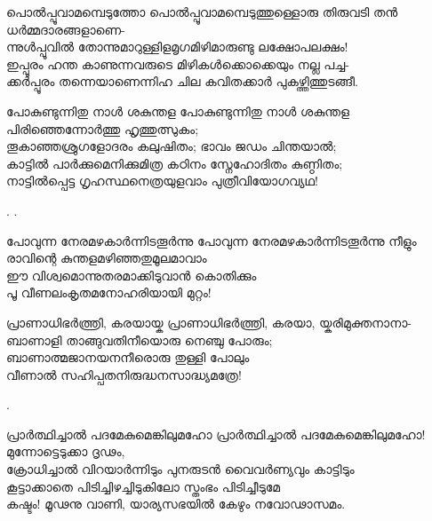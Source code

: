 \begin{enumerate}


\begin{slokam}{\VSr}{\VNM}{പൊൽപ്പൂവാമമ്പെടുത്തോ}
പൊൽപ്പൂവാമമ്പെടുത്തുള്ളൊരു തിരുവടി തൻ ധർമ്മദാരങ്ങളാണെ-\\
ന്നുൾപ്പൂവിൽ തോന്നുമാറുള്ളിളമൃഗമിഴിമാരുണ്ടു ലക്ഷോപലക്ഷം! \\
ഇപ്പൂരം ഹന്ത കാണുന്നവരുടെ മിഴികൾക്കൊക്കെയും നല്ല പച്ച-\\
ക്കർപ്പൂരം തന്നെയാണെന്നിഹ ചില കവിതക്കാർ പുകഴ്ത്തിത്തുടങ്ങീ.
\end{slokam}


\begin{slokam}{\VSv}{\ARRV}{പോകുണ്ടുന്നിതു നാൾ ശകുന്തള}
പോകുണ്ടുന്നിതു നാൾ ശകുന്തള പിരിഞ്ഞെന്നോർത്തു ഹൃത്തുത്സുകം;\\
തൂകാഞ്ഞശ്രുഗളോദരം കലുഷിതം; ഭാവം ജഡം ചിന്തയാൽ;\\
കാട്ടിൽ പാർക്കുമെനിക്കുമിത്ര കഠിനം സ്നേഹോദിതം കുണ്ഠിതം;\\
നാട്ടിൽപ്പെട്ട ഗൃഹസ്ഥനെത്രയുളവാം പുത്രീവിയോഗവ്യഥ!
\end{slokam}


.
.

\begin{slokam}{\VVt}{\HM}{പോവുന്ന നേരമഴകാർന്നിടതൂർന്നു}
പോവുന്ന നേരമഴകാർന്നിടതൂർന്നു നീളും\\
രാവിന്റെ കുന്തളമഴിഞ്ഞതുമൂലമാവാം\\
ഈ വിശ്വമൊന്നുതരമാക്കിടുവാൻ കൊതിക്കും\\
പൂ വീണലംകൃതമനോഹരിയായി മുറ്റം!
\end{slokam}





\begin{slokam}{\VVt}{\VNM}{പ്രാണാധിഭർത്ത്രി, കരയായ്ക}
 പ്രാണാധിഭർത്ത്രി, കരയാ, യ്കരിമുക്തനാനാ-\\
ബാണാളി താങ്ങുവതിനീയൊരു നെഞ്ചു പോരും;\\
ബാണാത്മജാനയനനീരൊരു തുള്ളി പോലും\\
വീണാൽ സഹിപ്പതനിരുദ്ധനസാദ്ധ്യമത്രേ!
\end{slokam}


.



\begin{slokam}{\VSv}{\ARRV}{പ്രാര്‍ത്ഥിച്ചാല്‍ പദമേകുമെങ്കിലുമഹോ}
 പ്രാര്‍ത്ഥിച്ചാല്‍ പദമേകുമെങ്കിലുമഹോ! മുന്നോട്ടെടുക്കാ ദൃഢം,\\
ക്രോധിച്ചാല്‍ വിറയാര്‍ന്നിടും പുനരുടന്‍ വൈവര്‍ണ്യവും കാട്ടിടും\\
കൂട്ടാക്കാതെ പിടിച്ചിഴച്ചിടുകിലോ സ്തംഭം പിടിച്ചീടുമേ\\
കഷ്ടം! മൂഢനു വാണി, യാര്യസഭയില്‍ കേഴും നവോഢാസമം.
\end{slokam}


\end{enumerate}
